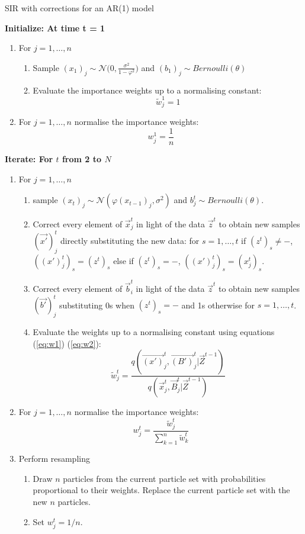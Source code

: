 \begin{algorithm}[H]
\caption{SIR with corrections for an AR(1) model}\label{SIR_AR1}
 \begin{algorithmic}

 \State  \bf{Initialize:} \normalfont At time t = 1
            
\begin{enumerate}
	\item For $j = 1, \dots , n$
	\begin{enumerate}
		\item Sample $(x_{1})_j \sim \mathcal{N} \Bigg (0, \frac{\sigma^2}{1- \varphi^2} \Bigg)$ and $(b_1)_j \sim Bernoulli(\theta)$
		\item Evaluate the importance weights up to a normalising constant:
		\[
		\tilde{w}^{1}_{j} = 1
		\]
	\end{enumerate}
	\item For $j = 1, \dots , n$ normalise the importance weights: 
	\[
	w^{1}_{j} = \frac{1}{n}
	\]
\end{enumerate}

 \State  \bf{Iterate:} \normalfont For $t$ from 2 to $N$

\begin{enumerate}
	\item For $j = 1, \dots , n$
	\begin{enumerate}
  		\item sample $(x_t)_j \sim \mathcal{N} (\varphi (x_{t-1})_j, \sigma^{2})$ and $b^t_{j} \sim Bernoulli(\theta)$.
		\item {Correct every element of $\vec{x}^t_j$ in light of the data $\vec{z}^t$ to obtain new samples $(\vec{x'})^t_j$ directly substituting the new data: for $s = 1, \dots ,t$ if $(z^t)_s \neq -$, $((x')_j^t)_s = (z^t)_s$ else if $(z^t)_s = -$, $((x')_j^t)_s = (x^t_j)_s$.}
		\item Correct every element of $\vec{b}_i^t$ in light of the data $\vec{z}^t$ to obtain new samples $(\vec{b'})^t_j$ substituting 0s when $(z^t)_s = -$ and 1s otherwise for $s = 1, \dots, t$.
		\item Evaluate the weights up to a normalising constant using equations (\ref{eq:w1}) (\ref{eq:w2}):
		\[
		\tilde{w}^{t}_{j} = \frac{q(\vec{(x')}^{t}_j, \vec{(B')}^{t}_j | \vec{Z}^{t-1})}{q(\vec{x}^{t}_j, \vec{B}^{t}_j | \vec{Z}^{t-1})}
		\]
	\end{enumerate}
	\item For $j = 1, \dots , n$ normalise the importance weights:
	\[
	w^{t}_{j} = \frac{\tilde{w}^t_j}{\sum_{k=1}^{n}\tilde{w}^{t}_k}
	\]
	\item Perform resampling
	\begin{enumerate}
	    \item Draw $n$ particles from the current particle set with probabilities proportional to their weights. Replace the current particle set with the new $n$ particles.
	    \item Set $w^t_j=1/n$.
	\end{enumerate}
\end{enumerate}
  
 \end{algorithmic}
\end{algorithm}
